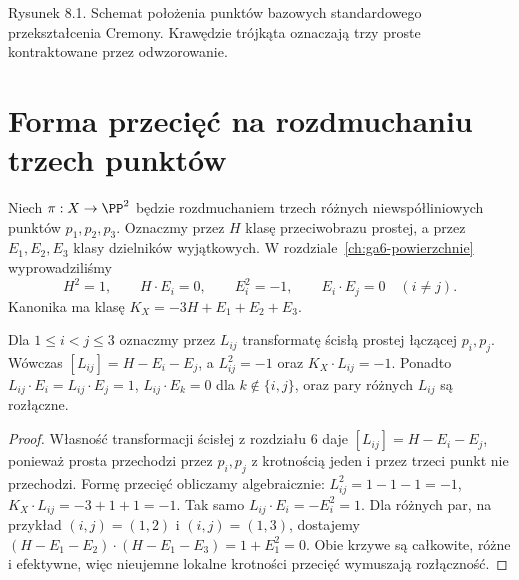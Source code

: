\begin{center}

{\small Rysunek 8.1. Schemat położenia punktów bazowych
standardowego przekształcenia Cremony. Krawędzie trójkąta
oznaczają trzy proste kontraktowane przez odwzorowanie.}\par
\end{center}

\section{Forma przecięć na rozdmuchaniu trzech punktów}
\label{sec:ga8-classes}

Niech $\pi:X\to\PP^2$ będzie rozdmuchaniem
trzech różnych niewspółliniowych punktów $p_1,p_2,p_3$.
Oznaczmy przez $H$ klasę przeciwobrazu prostej,
a przez $E_1,E_2,E_3$ klasy dzielników wyjątkowych.
W rozdziale~\ref{ch:ga6-powierzchnie} wyprowadziliśmy
\[
H^2=1,\qquad H\cdot E_i=0,\qquad
E_i^2=-1,\qquad E_i\cdot E_j=0\quad(i\ne j).
\]
Kanonika ma klasę $K_X=-3H+E_1+E_2+E_3$.

\begin{stwierdzenie}
\label{st:ga8-hexagon}
Dla $1\le i<j\le3$ oznaczmy przez $L_{ij}$
transformatę ścisłą prostej łączącej $p_i,p_j$.
Wówczas $[L_{ij}]=H-E_i-E_j$, a
$L_{ij}^2=-1$ oraz $K_X\cdot L_{ij}=-1$.
Ponadto $L_{ij}\cdot E_i=L_{ij}\cdot E_j=1$,
$L_{ij}\cdot E_k=0$ dla $k\notin\{i,j\}$,
oraz pary różnych $L_{ij}$ są rozłączne.
\end{stwierdzenie}
\begin{proof}
Własność transformacji ścisłej z rozdziału 6 daje
$[L_{ij}]=H-E_i-E_j$, ponieważ prosta przechodzi
przez $p_i,p_j$ z krotnością jeden i przez trzeci punkt
nie przechodzi. Formę przecięć obliczamy algebraicznie:
$L_{ij}^2=1-1-1=-1$,
$K_X\cdot L_{ij}=-3+1+1=-1$.
Tak samo $L_{ij}\cdot E_i= -E_i^2=1$.
Dla różnych par, na przykład $(i,j)=(1,2)$ i
$(i,j)=(1,3)$, dostajemy
$(H-E_1-E_2)\cdot(H-E_1-E_3)=1+E_1^2=0$.
Obie krzywe są całkowite, różne i efektywne, więc
nieujemne lokalne krotności przecięć wymuszają
rozłączność.
\end{proof}

